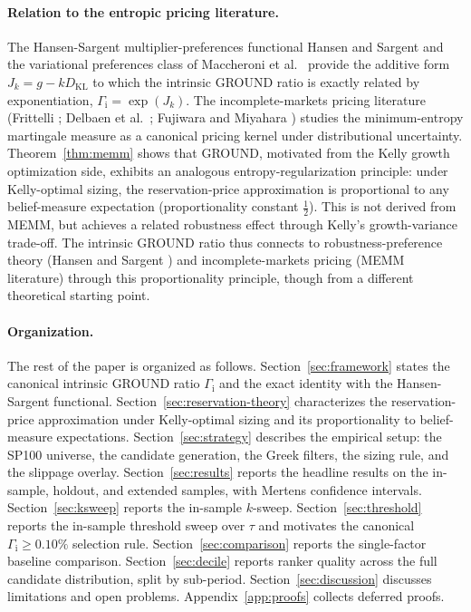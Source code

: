 \documentclass[11pt]{article}
\theoremstyle{definition}
\theoremstyle{remark}
\newcommand{\KL}{D_{\mathrm{KL}}}
\newcommand{\GROUND}{\Gamma_{\mathrm{i}}}
\begin{document}
\paragraph{Relation to the entropic pricing literature.}
The Hansen-Sargent multiplier-preferences functional
Hansen and Sargent \cite{hansen2008robustness} and the variational preferences class
of Maccheroni et al.\ \cite{maccheroni2006ambiguity} provide the additive form $J_k =
g - k \KL$ to which the intrinsic GROUND ratio is exactly related by
exponentiation, $\GROUND = \exp(J_k)$. The incomplete-markets pricing literature
(Frittelli \cite{frittelli2000}; Delbaen et al.\ \cite{delbaen2002}; Fujiwara and Miyahara \cite{fujiwara2003}) studies
the minimum-entropy martingale measure as a canonical pricing kernel under distributional uncertainty.
Theorem~\ref{thm:memm} shows that GROUND, motivated from the Kelly growth optimization side,
exhibits an analogous entropy-regularization principle: under Kelly-optimal sizing, the reservation-price approximation is proportional
to any belief-measure expectation (proportionality constant $\tfrac{1}{2}$). This is not derived from MEMM,
but achieves a related robustness effect through Kelly's growth-variance trade-off. The intrinsic
GROUND ratio thus connects to robustness-preference theory (Hansen and Sargent \cite{hansen2008robustness}) and incomplete-markets pricing
(MEMM literature) through this proportionality principle, though from a different theoretical starting point.

\paragraph{Organization.}
The rest of the paper is organized as follows.
Section~\ref{sec:framework} states the canonical intrinsic
GROUND ratio $\GROUND$ and
the exact identity with the Hansen-Sargent functional.
Section~\ref{sec:reservation-theory} characterizes the reservation-price approximation
under Kelly-optimal sizing and its proportionality to belief-measure expectations.
Section~\ref{sec:strategy} describes the empirical setup: the SP100
universe, the candidate generation, the Greek filters, the sizing
rule, and the slippage overlay. Section~\ref{sec:results} reports
the headline results on the in-sample, holdout, and extended
samples, with Mertens confidence intervals.
Section~\ref{sec:ksweep} reports the in-sample $k$-sweep.
Section~\ref{sec:threshold} reports the in-sample threshold
sweep over $\tau$ and motivates the canonical
$\GROUND \geq 0.10\%$ selection rule.
Section~\ref{sec:comparison} reports the single-factor baseline
comparison. Section~\ref{sec:decile} reports ranker quality across
the full candidate distribution, split by sub-period.
Section~\ref{sec:discussion} discusses limitations and open
problems. Appendix~\ref{app:proofs} collects deferred proofs.
\end{document}
